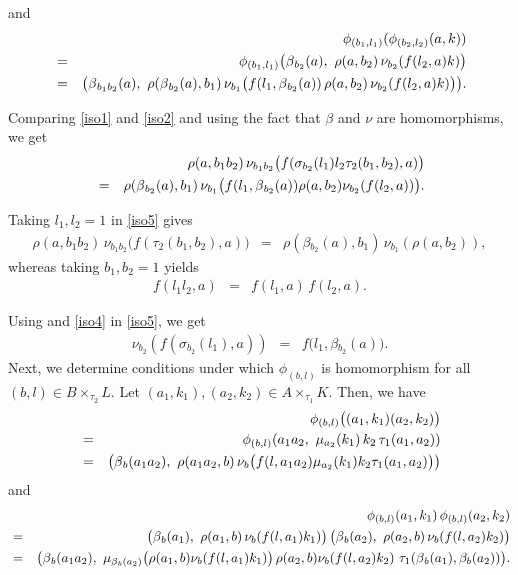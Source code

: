 \documentclass[11pt]{amsart}
\theoremstyle{thrm}
\theoremstyle{plain}
\theoremstyle{definition}
\numberwithin{equation}{section}
\begin{document}
and 
\begin{eqnarray}\label{iso2}
&& \phi_{(b_1,l_1)}(\phi_{(b_2,l_2)}(a,k))\\
&= & \phi_{(b_1,l_1)}\big( \beta{_{b_2}(a)}, ~\rho(a,b_2) \,\nu_{b_2}(f ( l_2,a)k)\big) \notag \\
&=& \big(\beta{_{b_1 b_2}(a)},~\rho(\beta{_{b_2}(a)}, b_1)\, \nu_{b_1}\big(f(l_1, \beta{_{b_2}(a))}\, \rho(a,b_2)\, \nu_{b_2}(f ( l_2,a)k) \big)\big). \notag
\end{eqnarray}

Comparing \eqref{iso1} and \eqref{iso2} and using the fact that $\beta$ and $\nu$ are homomorphisms, we get
\begin{eqnarray}\label{iso5}
&& \rho(a, b_1 b_2) \,\nu_{b_1 b_2}\big( f(\sigma_{b_2}(l_1)l_2\tau_2(b_1, b_2), a)\big)\\
&= & \rho(\beta{_{b_2}(a)}, b_1) \, \nu_{b_1}\big (f(l_1, \beta{_{b_2}(a))}\rho(a,b_2)  \nu_{b_2}(f ( l_2,a))\big) \notag.
\end{eqnarray}

Taking $l_1, l_2 =1$ in \eqref{iso5} gives
\begin{eqnarray}\label{iso3}
\rho(a, b_1 b_2) \,\nu_{b_1 b_2}\big( f(\tau_2(b_1, b_2), a)\big) &=& \rho(\beta{_{b_2}(a)}, b_1) \,\nu_{b_1}(\rho(a,b_2)),
\end{eqnarray} 
whereas taking $b_1, b_2=1$ yields
\begin{eqnarray}\label{iso4}
	f(l_1l_2,a) &=& f( l_1, a) \,f( l_2,a).
\end{eqnarray}

Using  and \eqref{iso4} in \eqref{iso5}, we get 
\begin{eqnarray}
	\nu_{b_2}(f(\sigma_{b_2}(l_1), a)) &=& f( l_1, \beta{_{b_2}(a))}.
\end{eqnarray}
Next, we determine conditions  under which $\phi_{(b,l)}$ is homomorphism for all $(b,l) \in  B \times_{\tau_2} L$. Let $(a_1,k_1), (a_2, k_2) \in A \times_{\tau_1} K$. Then, we have
\begin{eqnarray}\label{hom1}
&& \phi_{(b,l)} \big((a_1,k_1) (a_2, k_2)\big) \\
&=& \phi_{(b,l)}(a_1 a_2, ~\mu_{a_2}(k_1)\,k_2 \,\tau_1(a_1, a_2))\notag\\
&=& \big(\beta{_{b}(a_1 a_2)}, ~\rho(a_1 a_2,b)  \,\nu_b \big( f(l, a_1 a_2)\mu_{a_2}(k_1)k_2\tau_1(a_1, a_2)\big)\big) \notag
\end{eqnarray}
and
\begin{eqnarray}\label{hom2}
	&& \phi_{(b,l)}(a_1,k_1)\, \phi_{(b,l)}(a_2,k_2)\\
	&= & \big(\beta{_{b}(a_1)}, ~\rho(a_1,b)  \, \nu_{b} (f(l,a_1)k_1)\big) \,\big(\beta{_{b}(a_2)}, ~ \rho(a_2,b)  \,\nu_b(f(l,a_2) k_2)\big)\notag \\
	&= & \big(\beta{_{b}(a_1 a_2)}, ~\mu_{ \beta{_{b}(a_2)}} \big(\rho(a_1,b)   \nu_{b} (f(l,a_1)k_1)\big)\, \rho(a_2,b)  \nu_b(f(l,a_2) k_2) ~\tau_1(\beta{_{b}(a_1)}, \beta_{b}(a_2)) \big). \notag
\end{eqnarray}
\end{document}

